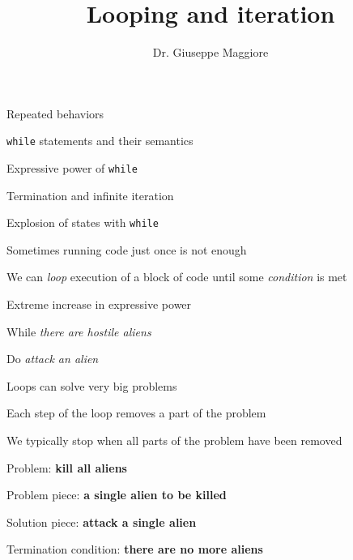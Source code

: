 \documentclass{beamer}
\title{Looping and iteration}
\author{Dr. Giuseppe Maggiore}
\institute{Hogeschool Rotterdam \\ 
Rotterdam, Netherlands}
\date{}
\begin{document}
\maketitle

\begin{slide}{
\item Repeated behaviors
\item \texttt{while} statements and their semantics
\item Expressive power of \texttt{while}
\item Termination and infinite iteration
\item Explosion of states with \texttt{while}
}\end{slide}


\begin{slide}{
\item Sometimes running code just once is not enough
\item We can \textit{loop} execution of a block of code until some \textit{condition} is met
\item Extreme increase in expressive power
}\end{slide}

\begin{slide}{
\item While \textit{there are hostile aliens}
\item Do \textit{attack an alien}
}\end{slide}

\begin{slide}{
\item Loops can solve very big problems
\item Each step of the loop removes a part of the problem
\item We typically stop when all parts of the problem have been removed
}\end{slide}

\begin{slide}{
\item Problem: \textbf{kill all aliens}
\item Problem piece: \textbf{a single alien to be killed}
\item Solution piece: \textbf{attack a single alien}
\item Termination condition: \textbf{there are no more aliens}
}\end{slide}
\end{document}
